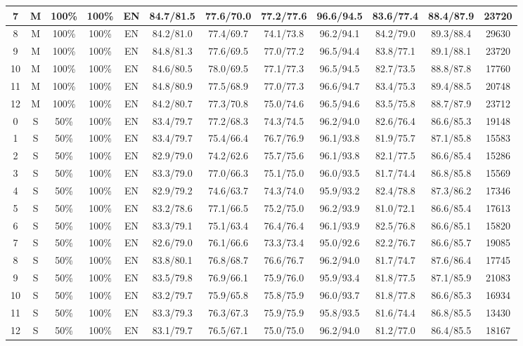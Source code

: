 \begin{table*}
{\begin{tabular}{|c|c|c|c|c||c|c|c|c|c|c||c|}
7 & M & 100\% & 100\% & EN & 84.7/81.5 & 77.6/70.0 & 77.2/77.6 & 96.6/94.5 & 83.6/77.4 & 88.4/87.9 & 23720 \\ \hline
8 & M & 100\% & 100\% & EN & 84.2/81.0 & 77.4/69.7 & 74.1/73.8 & 96.2/94.1 & 84.2/79.0 & 89.3/88.4 & 29630 \\ \hline
9 & M & 100\% & 100\% & EN & 84.8/81.3 & 77.6/69.5 & 77.0/77.2 & 96.5/94.4 & 83.8/77.1 & 89.1/88.1 & 23720 \\ \hline
10 & M & 100\% & 100\% & EN & 84.6/80.5 & 78.0/69.5 & 77.1/77.3 & 96.5/94.5 & 82.7/73.5 & 88.8/87.8 & 17760 \\ \hline
11 & M & 100\% & 100\% & EN & 84.8/80.9 & 77.5/68.9 & 77.0/77.3 & 96.6/94.7 & 83.4/75.3 & 89.4/88.5 & 20748 \\ \hline
12 & M & 100\% & 100\% & EN & 84.2/80.7 & 77.3/70.8 & 75.0/74.6 & 96.5/94.6 & 83.5/75.8 & 88.7/87.9 & 23712 \\ \hline
0 & S & 50\% & 100\% & EN & 83.4/79.7 & 77.2/68.3 & 74.3/74.5 & 96.2/94.0 & 82.6/76.4 & 86.6/85.3 & 19148 \\ \hline
1 & S & 50\% & 100\% & EN & 83.4/79.7 & 75.4/66.4 & 76.7/76.9 & 96.1/93.8 & 81.9/75.7 & 87.1/85.8 & 15583 \\ \hline
2 & S & 50\% & 100\% & EN & 82.9/79.0 & 74.2/62.6 & 75.7/75.6 & 96.1/93.8 & 82.1/77.5 & 86.6/85.4 & 15286 \\ \hline
3 & S & 50\% & 100\% & EN & 83.3/79.0 & 77.0/66.3 & 75.1/75.0 & 96.0/93.5 & 81.7/74.4 & 86.8/85.8 & 15569 \\ \hline
4 & S & 50\% & 100\% & EN & 82.9/79.2 & 74.6/63.7 & 74.3/74.0 & 95.9/93.2 & 82.4/78.8 & 87.3/86.2 & 17346 \\ \hline
5 & S & 50\% & 100\% & EN & 83.2/78.6 & 77.1/66.5 & 75.2/75.0 & 96.2/93.9 & 81.0/72.1 & 86.6/85.4 & 17613 \\ \hline
6 & S & 50\% & 100\% & EN & 83.3/79.1 & 75.1/63.4 & 76.4/76.4 & 96.1/93.9 & 82.5/76.8 & 86.6/85.1 & 15820 \\ \hline
7 & S & 50\% & 100\% & EN & 82.6/79.0 & 76.1/66.6 & 73.3/73.4 & 95.0/92.6 & 82.2/76.7 & 86.6/85.7 & 19085 \\ \hline
8 & S & 50\% & 100\% & EN & 83.8/80.1 & 76.8/68.7 & 76.6/76.7 & 96.2/94.0 & 81.7/74.7 & 87.6/86.4 & 17745 \\ \hline
9 & S & 50\% & 100\% & EN & 83.5/79.8 & 76.9/66.1 & 75.9/76.0 & 95.9/93.4 & 81.8/77.5 & 87.1/85.9 & 21083 \\ \hline
10 & S & 50\% & 100\% & EN & 83.2/79.7 & 75.9/65.8 & 75.8/75.9 & 96.0/93.7 & 81.8/77.8 & 86.6/85.3 & 16934 \\ \hline
11 & S & 50\% & 100\% & EN & 83.3/79.3 & 76.3/67.3 & 75.9/75.9 & 95.8/93.5 & 81.6/74.4 & 86.8/85.5 & 13430 \\ \hline
12 & S & 50\% & 100\% & EN & 83.1/79.7 & 76.5/67.1 & 75.0/75.0 & 96.2/94.0 & 81.2/77.0 & 86.4/85.5 & 18167 \\ \hline
\end{tabular}}
\end{table*}

